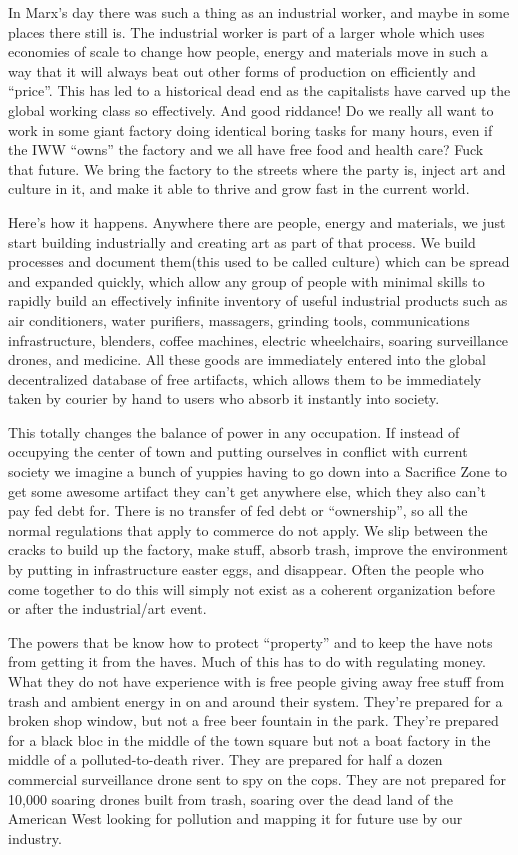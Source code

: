 In Marx's day there was such a thing as an industrial worker, and maybe
in some places there still is. The industrial worker is part of a larger
whole which uses economies of scale to change how people, energy and
materials move in such a way that it will always beat out other forms of
production on efficiently and ``price''. This has led to a historical
dead end as the capitalists have carved up the global working class so
effectively. And good riddance! Do we really all want to work in some
giant factory doing identical boring tasks for many hours, even if the
IWW ``owns'' the factory and we all have free food and health care? Fuck
that future. We bring the factory to the streets where the party is,
inject art and culture in it, and make it able to thrive and grow fast
in the current world.

Here's how it happens. Anywhere there are people, energy and materials,
we just start building industrially and creating art as part of that
process. We build processes and document them(this used to be called
culture) which can be spread and expanded quickly, which allow any group
of people with minimal skills to rapidly build an effectively infinite
inventory of useful industrial products such as air conditioners, water
purifiers, massagers, grinding tools, communications infrastructure,
blenders, coffee machines, electric wheelchairs, soaring surveillance
drones, and medicine. All these goods are immediately entered into the
global decentralized database of free artifacts, which allows them to be
immediately taken by courier by hand to users who absorb it instantly
into society.

This totally changes the balance of power in any occupation. If instead
of occupying the center of town and putting ourselves in conflict with
current society we imagine a bunch of yuppies having to go down into a
Sacrifice Zone to get some awesome artifact they can't get anywhere
else, which they also can't pay fed debt for. There is no transfer of
fed debt or ``ownership'', so all the normal regulations that apply to
commerce do not apply. We slip between the cracks to build up the
factory, make stuff, absorb trash, improve the environment by putting in
infrastructure easter eggs, and disappear. Often the people who come
together to do this will simply not exist as a coherent organization
before or after the industrial/art event.

The powers that be know how to protect ``property'' and to keep the have
nots from getting it from the haves. Much of this has to do with
regulating money. What they do not have experience with is free people
giving away free stuff from trash and ambient energy in on and around
their system. They're prepared for a broken shop window, but not a free
beer fountain in the park. They're prepared for a black bloc in the
middle of the town square but not a boat factory in the middle of a
polluted-to-death river. They are prepared for half a dozen commercial
surveillance drone sent to spy on the cops. They are not prepared for
10,000 soaring drones built from trash, soaring over the dead land of
the American West looking for pollution and mapping it for future use by
our industry.

